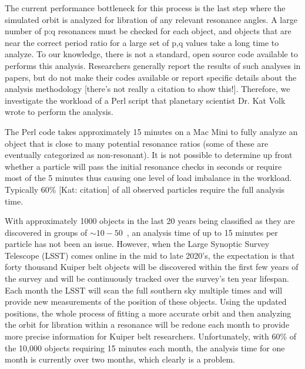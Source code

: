 \documentclass[conference]{IEEEtran}
\begin{document}
The current performance bottleneck for this process is the
last step where the simulated orbit is analyzed for libration of any 
relevant resonance angles. A large number of p:q resonances must be
checked for each object, and objects that are near the correct period
ratio for a large set of p,q values take a long time to analyze.
To our knowledge, there is not a standard, open source code available to 
performs this analysis.  Researchers generally report
the results of such analyses in papers, but do not make their
codes available or report specific details about the analysis 
methodology [there's not really a citation to show this!].%
Therefore, we investigate the workload of a Perl script
that planetary scientist Dr. Kat Volk wrote to perform the analysis.

The Perl code takes approximately 15 minutes on a Mac Mini to fully analyze an 
object that is close to many potential resonance ratios (some of these 
are eventually categorized as non-resonant).
It is not possible to determine up front whether a particle will pass
the initial resonance checks in seconds or require most of the 5 minutes
thus causing one level of load imbalance in the workload.
Typically 60\% [Kat: citation] of all observed particles require
the full analysis time.

With approximately
1000 objects in the last 20 years being classified as they are discovered in
groups of $\sim10-50$~\cite{Volk2016}, an analysis time
of up to 15 minutes per particle has not been an issue.
However, when the Large Synoptic Survey Telescope (LSST) comes 
online in the mid to late 2020's, the expectation is that forty thousand 
Kuiper belt objects will be discovered within the first few years of the survey
and will be continuously tracked over the survey's ten year lifespan.
Each month the LSST will scan the full southern sky multiple times and will provide new
measurements of the position of these objects.  Using the updated positions, the 
whole process of fitting a more accurate orbit and then 
analyzing the orbit for libration within a resonance will be redone
each month to provide more precise information for Kuiper belt researchers.
Unfortunately, with 60\% of the 10,000 objects requiring 15 minutes
each month, the analysis time for one month is currently over two months,
which clearly is a problem.
\end{document}
